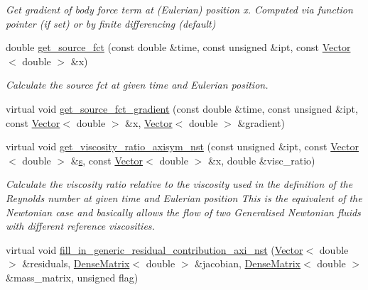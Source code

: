 \begin{DoxyCompactItemize}
\begin{DoxyCompactList}\small\item\em Get gradient of body force term at (Eulerian) position x. Computed via function pointer (if set) or by finite differencing (default) \end{DoxyCompactList}\item 
double \hyperlink{classoomph_1_1GeneralisedNewtonianAxisymmetricNavierStokesEquations_a8db87dc65690887c81940410b2701ed9}{get\+\_\+source\+\_\+fct} (const double \&time, const unsigned \&ipt, const \hyperlink{classoomph_1_1Vector}{Vector}$<$ double $>$ \&x)
\begin{DoxyCompactList}\small\item\em Calculate the source fct at given time and Eulerian position. \end{DoxyCompactList}\item 
virtual void \hyperlink{classoomph_1_1GeneralisedNewtonianAxisymmetricNavierStokesEquations_a0848107a66e1a7403aad3b5d312b1603}{get\+\_\+source\+\_\+fct\+\_\+gradient} (const double \&time, const unsigned \&ipt, const \hyperlink{classoomph_1_1Vector}{Vector}$<$ double $>$ \&x, \hyperlink{classoomph_1_1Vector}{Vector}$<$ double $>$ \&gradient)
\item 
virtual void \hyperlink{classoomph_1_1GeneralisedNewtonianAxisymmetricNavierStokesEquations_a955bccd22242be81a5ee731a8731438a}{get\+\_\+viscosity\+\_\+ratio\+\_\+axisym\+\_\+nst} (const unsigned \&ipt, const \hyperlink{classoomph_1_1Vector}{Vector}$<$ double $>$ \&\hyperlink{cfortran_8h_ab7123126e4885ef647dd9c6e3807a21c}{s}, const \hyperlink{classoomph_1_1Vector}{Vector}$<$ double $>$ \&x, double \&visc\+\_\+ratio)
\begin{DoxyCompactList}\small\item\em Calculate the viscosity ratio relative to the viscosity used in the definition of the Reynolds number at given time and Eulerian position This is the equivalent of the Newtonian case and basically allows the flow of two Generalised Newtonian fluids with different reference viscosities. \end{DoxyCompactList}\item 
virtual void \hyperlink{classoomph_1_1GeneralisedNewtonianAxisymmetricNavierStokesEquations_ad41c00dfe90c6dbc9e53fac71f20489e}{fill\+\_\+in\+\_\+generic\+\_\+residual\+\_\+contribution\+\_\+axi\+\_\+nst} (\hyperlink{classoomph_1_1Vector}{Vector}$<$ double $>$ \&residuals, \hyperlink{classoomph_1_1DenseMatrix}{Dense\+Matrix}$<$ double $>$ \&jacobian, \hyperlink{classoomph_1_1DenseMatrix}{Dense\+Matrix}$<$ double $>$ \&mass\+\_\+matrix, unsigned flag)

\end{DoxyCompactItemize}
